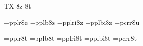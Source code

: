 
\ifx\ffdecl\undefined  \fi

\ffdecl [Palatino] {\caps{\rm\bf}} {\rm \bf \it \bi} {} {TX} {8z 8t}

\def\caps{\ffvars{r}{b}{!}{!}\ffsetV{caps}{c}\ffsetX} 
\def\nocaps{\ffsetX} 
\nocaps\relax %
\def\ffwarning#1{\ffmessage{FONT warning: Palatino - \string\caps#1 unavailable}}

\ismacro{}\ifttrue
   \font\tenrm=pplr8z   \sizespec
   \font\tenbf=pplb8z   \sizespec
   \font\tenit=pplri8z  \sizespec
   \font\tenbi=pplbi8z  \sizespec
   \font\tentt=pcrr8u   \sizespec
   \let\tensl=\tenit

   \def\ffnamegen{ppl\ffvarV\capsV 8z}

   
\fi

\ismacro{}\ifttrue
   \font\tenrm=pplr8t   \sizespec
   \font\tenbf=pplb8t   \sizespec
   \font\tenit=pplri8t  \sizespec
   \font\tenbi=pplbi8t  \sizespec
   \font\tentt=pcrr8t   \sizespec
   \let\tensl=\tenit

   \def\ffnamegen{ppl\ffvarV\capsV 8t}
\fi

\tenrm

\let\setsimplemath=\relax %

\def\palTeX{T\kern-.1667em\lower.3333ex\hbox{E}\kern-.125emX}
\ifx\origTeX\undefined \let\origTeX=\TeX \fi
\let\TeX=\palTeX

\ifx\loadmathfonts\relax \endinput \fi
\ifx\mathpreloaded X\else  \fi                     


